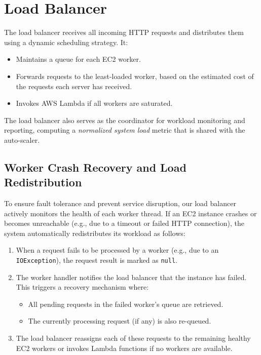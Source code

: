 \documentclass[conference]{IEEEtran}
\begin{document}
\section{Load Balancer}
The load balancer receives all incoming HTTP requests and distributes them using
a dynamic scheduling strategy. It:

\begin{itemize}
    \item Maintains a queue for each EC2 worker.
    \item Forwards requests to the least-loaded worker, based on the estimated cost
    of the requests each server has received.
    \item Invokes AWS Lambda if all workers are saturated.
\end{itemize}

The load balancer also serves as the coordinator for workload monitoring and
reporting, computing a \textit{normalized system load} metric that is shared
with the auto-scaler.

\subsection{Worker Crash Recovery and Load Redistribution}

To ensure fault tolerance and prevent service disruption, our load balancer
actively monitors the health of each worker thread. If an EC2 instance crashes
or becomes unreachable (e.g., due to a timeout or failed HTTP connection), the
system automatically redistributes its workload as follows:

\begin{enumerate}
    \item When a request fails to be processed by a worker (e.g., due to an
    \texttt{IOException}), the request result is marked as \texttt{null}.
    \item The worker handler notifies the load balancer that the instance has
    failed. This triggers a recovery mechanism where:
    \begin{itemize}
        \item All pending requests in the failed worker's queue are retrieved.
        \item The currently processing request (if any) is also re-queued.
    \end{itemize}
    \item The load balancer reassigns each of these requests to the remaining
    healthy EC2 workers or invokes Lambda functions if no workers are
    available.
\end{enumerate}
\end{document}
